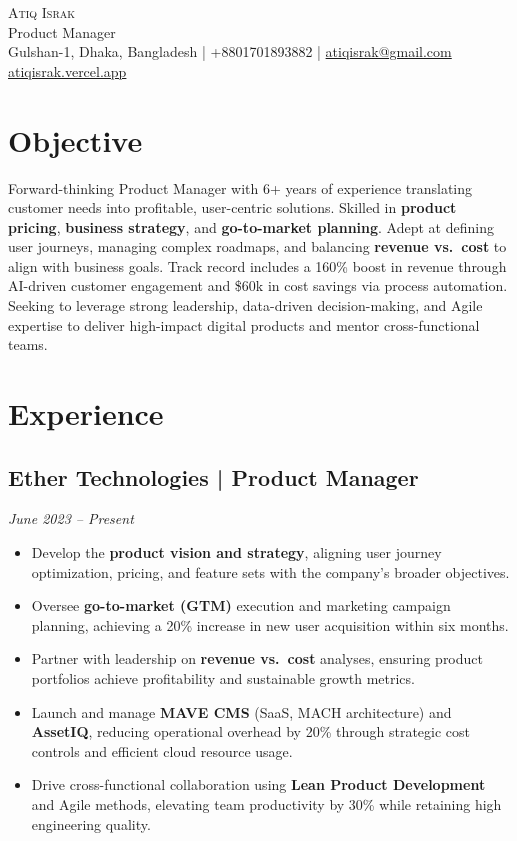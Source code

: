 \documentclass[a4paper,10pt]{article}
\begin{document}
\begin{center}
    \Huge \textsc{Atiq Israk}\\[2pt]
    \normalsize Product Manager \\[5pt]
    \normalsize Gulshan-1, Dhaka, Bangladesh | +8801701893882 | \href{mailto:atiqisrak@gmail.com}{atiqisrak@gmail.com} \\[5pt]
    \normalsize \href{https://atiqisrak.vercel.app}{atiqisrak.vercel.app}
\end{center}

\section*{Objective}
Forward-thinking Product Manager with 6+ years of experience translating customer needs into profitable, user-centric solutions. Skilled in \textbf{product pricing}, \textbf{business strategy}, and \textbf{go-to-market planning}. Adept at defining user journeys, managing complex roadmaps, and balancing \textbf{revenue vs.\ cost} to align with business goals. Track record includes a 160\% boost in revenue through AI-driven customer engagement and \$60k in cost savings via process automation. Seeking to leverage strong leadership, data-driven decision-making, and Agile expertise to deliver high-impact digital products and mentor cross-functional teams.

\section*{Experience}

\subsection*{Ether Technologies | Product Manager}
\textit{June 2023 – Present}
\begin{itemize}[leftmargin=*]
    \item Develop the \textbf{product vision and strategy}, aligning user journey optimization, pricing, and feature sets with the company's broader objectives. 
    \item Oversee \textbf{go-to-market (GTM)} execution and marketing campaign planning, achieving a 20\% increase in new user acquisition within six months.
    \item Partner with leadership on \textbf{revenue vs.\ cost} analyses, ensuring product portfolios achieve profitability and sustainable growth metrics.
    \item Launch and manage \textbf{MAVE CMS} (SaaS, MACH architecture) and \textbf{AssetIQ}, reducing operational overhead by 20\% through strategic cost controls and efficient cloud resource usage.
    \item Drive cross-functional collaboration using \textbf{Lean Product Development} and Agile methods, elevating team productivity by 30\% while retaining high engineering quality.
\end{itemize}
\end{document}
